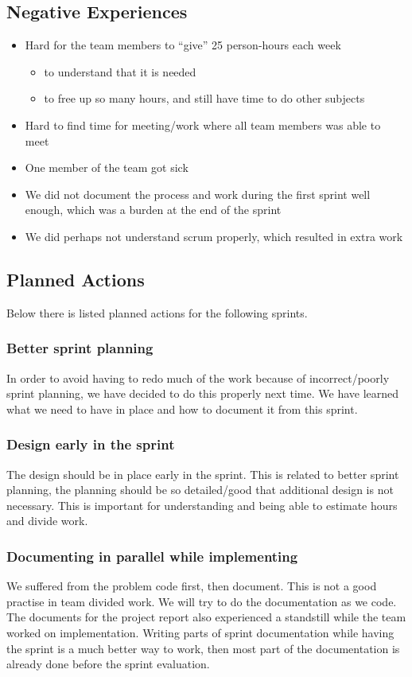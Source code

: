 \subsection{Negative Experiences}
\begin{itemize}
	\item Hard for the team members to “give” 25 person-hours each week
	\begin{itemize}
		\item to understand that it is needed
		\item to free up so many hours, and still have time to do other subjects
	\end{itemize}
	\item Hard to find time for meeting/work where all team members was able to meet
	\item One member of the team got sick
	\item We did not document the process and work during the first sprint well enough, which was a burden at the end of the sprint
	\item We did perhaps not understand scrum properly, which resulted in extra work
\end{itemize}

\subsection{Planned Actions}
Below there is listed planned actions for the following sprints.

\subsubsection{Better sprint planning}
In order to avoid having to redo much of the work because of incorrect/poorly sprint planning, we have decided to do this properly next time. We have learned what we need to have in place and how to document it from this sprint.

\subsubsection{Design early in the sprint} 
The design should be in place early in the sprint. This is related to better sprint planning, the planning should be so detailed/good that additional design is not necessary. This is important for understanding and being able to estimate hours and divide work.

\subsubsection{Documenting in parallel while implementing}
We suffered from the problem code first, then document. This is not a good practise in team divided work. We will try to do the documentation as we code.
The documents for the project report also experienced a standstill while the team worked on implementation. Writing parts of sprint documentation while having the sprint is a much better way to work, then most part of the documentation is already done before the sprint evaluation.

